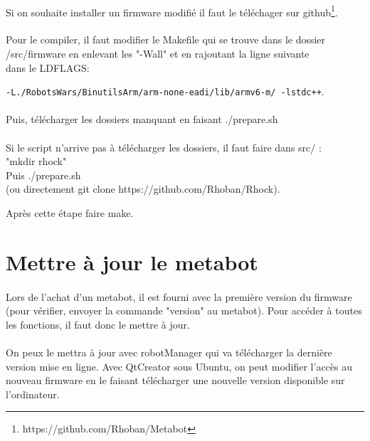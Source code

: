 \documentclass[10pt,a4paper]{report}
\begin{document}
\paragraph{}

Si on souhaite installer un firmware modifié il faut le téléchager sur github\footnote{https://github.com/Rhoban/Metabot}.
\paragraph{}
Pour le compiler, il faut modifier le Makefile qui se trouve dans le dossier\\ /src/firmware en enlevant les "-Wall" et en rajoutant la ligne suivante \\dans le LDFLAGS:

\texttt{-L./RobotsWars/BinutilsArm/arm-none-eadi/lib/armv6-m/ -lstdc++}.


\paragraph{}
Puis, télécharger les dossiers manquant en faisant ./prepare.sh
\paragraph{}
Si le script n'arrive pas à télécharger les dossiers, il faut faire dans src/ :\\
"mkdir rhock"  \\
Puis ./prepare.sh \\
(ou directement git clone https://github.com/Rhoban/Rhock).

Après cette étape faire make.

\section{Mettre à jour le metabot}
\paragraph{}
Lors de l'achat d'un metabot, il est fourni avec la première version du firmware (pour vérifier, envoyer la commande "version" au metabot). Pour accéder à toutes les fonctions, il faut donc le mettre à jour.
\paragraph{}
On peux le mettra à jour avec robotManager qui va télécharger la dernière version mise en ligne.
Avec QtCreator sous Ubuntu, on peut modifier l'accès au nouveau firmware en le faisant télécharger une nouvelle version disponible sur l'ordinateur.
\end{document}
